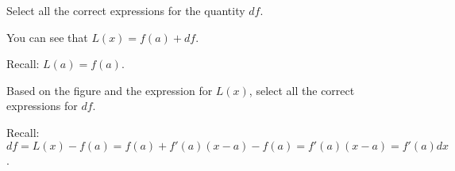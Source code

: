 \documentclass{ximera}
\begin{document}
  
  \begin{question}
  Select all the correct expressions for the quantity $df$.
   \begin{hint}
     You can see that $L(x)=f(a)+df$.
    \end{hint}
      \begin{hint}
    Recall: $L(a)=f(a)$.
    \end{hint}
    \begin{selectAll}
    \end{selectAll}
  \end{question}











\begin{question}
Based on  the figure and the expression for $L(x)$, select all the correct expressions for $df$.
 \begin{hint}
    Recall: $df=L(x)-f(a)=f(a)+f'(a)(x-a)-f(a)=f'(a)(x-a)=f'(a)dx$.
    \end{hint}
      \begin{selectAll}
      \end{selectAll}
  \end{question}
  
\end{document}
